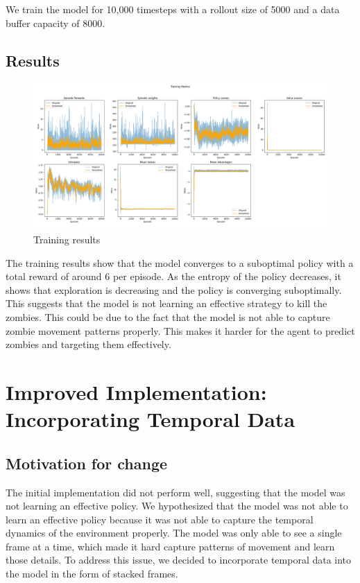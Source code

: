 \documentclass{article}
\begin{document}
We train the model for 10,000 timesteps with a rollout size of 5000 and a data buffer capacity of 8000.


\subsection{Results}

\begin{figure}[h]
  \centering
  \includegraphics[scale=0.3]{run6.png}
  \caption{Training results}
  \label{fig:training_results_no_temporal}
\end{figure}

The training results show that the model converges to a suboptimal policy with a total reward of around 6 per episode. As the entropy 
of the policy decreases, it shows that exploration is decreasing and the policy is converging suboptimally. This suggests that the model is not learning
an effective strategy to kill the zombies. This could be due to the fact that the model is not able to capture zombie movement patterns properly. This makes it 
harder for the agent to predict zombies and targeting them effectively.

\section{Improved Implementation: Incorporating Temporal Data}
\subsection{Motivation for change}
The initial implementation did not perform well, suggesting that the model was not learning an effective policy. We hypothesized that the model
was not able to learn an effective policy because it was not able to capture the temporal dynamics of the environment properly. The model was only able to see
a single frame at a time, which made it hard capture patterns of movement and learn those details. 
To address this issue, we decided to incorporate temporal data into the model in the form of stacked frames.
\end{document}
